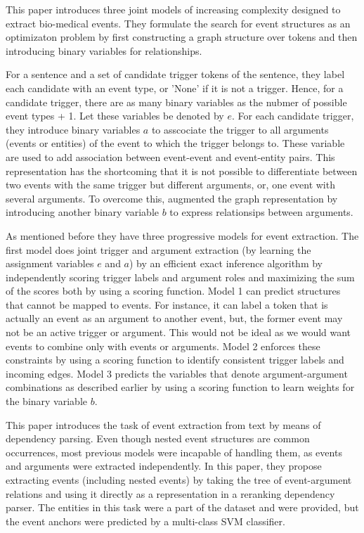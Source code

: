 
This paper introduces three joint models of increasing complexity designed to extract bio-medical events. They formulate the search for event structures as an optimizaton problem by first constructing a graph structure over tokens and then introducing binary variables for relationships. 

For a sentence and a set of candidate trigger tokens of the sentence, they label each candidate with an event type, or 'None' if it is not a trigger. Hence, for a candidate trigger, there are as many binary variables as the nubmer of possible event types + 1. Let these variables be denoted by ${e}$. For each candidate trigger, they introduce binary variables ${a}$ to asscociate the trigger to all arguments (events or entities) of the event to which the trigger belongs to. These variable are used to add association between event-event and event-entity pairs. This representation has the shortcoming that it is not possible to differentiate between two events with the same trigger but different arguments, or, one event with several arguments. To overcome this, \citeauthor{riedelmc} augmented the graph representation by introducing another binary variable ${b}$ to express relationsips between arguments. 

As mentioned before they have three progressive models for event extraction. The first model does joint trigger and argument extraction (by learning the assignment variables ${e}$ and ${a}$) by an efficient exact inference algorithm by independently scoring trigger labels and argument roles and maximizing the sum of the scores both by using a scoring function. Model 1 can predict structures that cannot be mapped to events. For instance, it can label a token that is actually an event as an argument to another event, but, the former event may not be an active trigger or argument. This would not be ideal as we would want events to combine only with events or arguments. Model 2 enforces these constraints by using a scoring function to identify consistent trigger labels and incoming edges. Model 3 predicts the variables that denote argument-argument combinations as described earlier by using a scoring function to learn weights for the binary variable ${b}$.\\


This paper introduces the task of event extraction from text by means of dependency parsing. Even though nested event structures are common occurrences, most previous models were incapable of handling them, as events and arguments were extracted independently. In this paper, they propose extracting events (including nested events) by taking the tree of event-argument relations and using it directly as a representation in a reranking dependency parser. The entities in this task were a part of the dataset and were provided, but the event anchors were predicted by a multi-class SVM classifier. 

